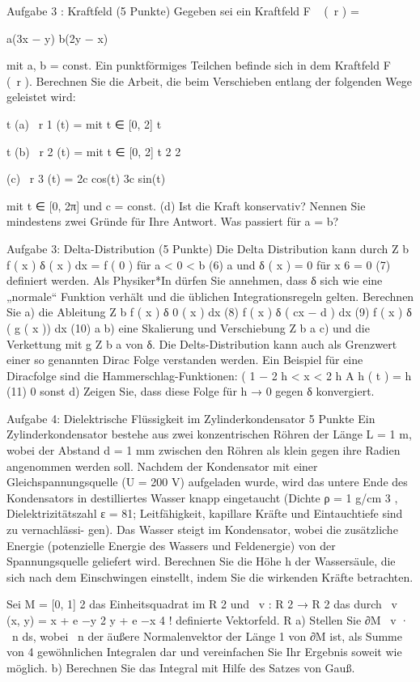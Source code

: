 Aufgabe 3 : Kraftfeld
(5 Punkte)
Gegeben sei ein Kraftfeld
F ~ (~r ) =

a(3x − y)
b(2y − x)

mit a, b = const.
Ein punktförmiges Teilchen befinde sich in dem Kraftfeld F ~ (~r ). Berechnen Sie die Arbeit, die
beim Verschieben entlang der folgenden Wege geleistet wird:
 
t
(a) ~r 1 (t) =
mit t ∈ [0, 2]
t


t
(b) ~r 2 (t) =
mit t ∈ [0, 2]
t 2
2

(c) ~r 3 (t) =
2c cos(t)
3c sin(t)

mit t ∈ [0, 2π] und c = const.
(d) Ist die Kraft konservativ? Nennen Sie mindestens zwei Gründe für Ihre Antwort. Was
passiert für a = b?



Aufgabe 3: Delta-Distribution
(5 Punkte)
Die Delta Distribution kann durch
Z b
f ( x ) δ ( x ) dx = f ( 0 )
für
a < 0 < b
(6)
a
und
δ ( x ) = 0
für
x 6 = 0
(7)
definiert werden. Als Physiker*In dürfen Sie annehmen, dass δ sich wie eine „normale“
Funktion verhält und die üblichen Integrationsregeln gelten. Berechnen Sie
a) die Ableitung
Z b
f ( x ) δ 0 ( x ) dx (8)
f ( x ) δ ( cx − d ) dx (9)
f ( x ) δ ( g ( x )) dx (10)
a
b) eine Skalierung und Verschiebung
Z b
a
c) und die Verkettung mit g
Z b
a
von δ. Die Delts-Distribution kann auch als Grenzwert einer so genannten Dirac Folge
verstanden werden. Ein Beispiel für eine Diracfolge sind die Hammerschlag-Funktionen:
(
1
− 2 h < x < 2 h
A h ( t ) = h
(11)
0 sonst
d) Zeigen Sie, dass diese Folge für h → 0 gegen δ konvergiert.


Aufgabe 4:
Dielektrische Flüssigkeit im Zylinderkondensator
5 Punkte
Ein Zylinderkondensator bestehe aus zwei konzentrischen Röhren der Länge L = 1 m, wobei der
Abstand d = 1 mm zwischen den Röhren als klein gegen ihre Radien angenommen werden soll.
Nachdem der Kondensator mit einer Gleichspannungsquelle (U = 200 V) aufgeladen wurde, wird
das untere Ende des Kondensators in destilliertes Wasser knapp eingetaucht (Dichte ρ = 1 g/cm 3 ,
Dielektrizitätszahl ε = 81; Leitfähigkeit, kapillare Kräfte und Eintauchtiefe sind zu vernachlässi-
gen). Das Wasser steigt im Kondensator, wobei die zusätzliche Energie (potenzielle Energie des
Wassers und Feldenergie) von der Spannungsquelle geliefert wird.
Berechnen Sie die Höhe h der Wassersäule, die sich nach dem Einschwingen einstellt, indem Sie die
wirkenden Kräfte betrachten.


Sei M = [0, 1] 2 das Einheitsquadrat im R 2 und ~v : R 2 → R 2 das durch
~v (x, y) =
x + e −y 2
y + e −x 4
!
definierte Vektorfeld.
R
a) Stellen Sie ∂M ~v · ~n ds, wobei ~n der äußere Normalenvektor der Länge 1 von
∂M ist, als Summe von 4 gewöhnlichen Integralen dar und vereinfachen Sie
Ihr Ergebnis soweit wie möglich.
b) Berechnen Sie das Integral mit Hilfe des Satzes von Gauß.
